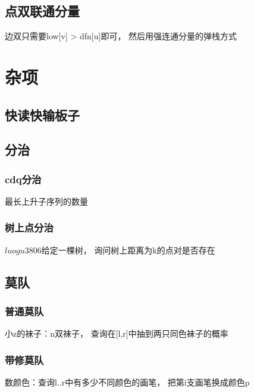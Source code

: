 \documentclass[UTF8]{article}
\newcommand{\cppcode}[1]{
    
}
\begin{document}
\subsection{点双联通分量}
边双只需要low[v] > dfn[u]即可， 然后用强连通分量的弹栈方式
\cppcode{DCC.cpp}


\newpage

\section{杂项}

\subsection{快读快输板子}
\cppcode{io.cpp}

\subsection{分治}
\subsubsection{cdq分治}

最长上升子序列的数量

\cppcode{cdq.cpp}

\subsubsection{树上点分治}

$luogu3806$给定一棵树， 询问树上距离为k的点对是否存在

\cppcode{DConTree.cpp}

\subsection{莫队}
\subsubsection{普通莫队}
小z的袜子：n双袜子， 查询在[l,r]中抽到两只同色袜子的概率
\cppcode{Mo3.cpp}
\subsubsection{带修莫队}
数颜色：查询l..r中有多少不同颜色的画笔， 把第i支画笔换成颜色p
\cppcode{Mo2.cpp}
\end{document}

